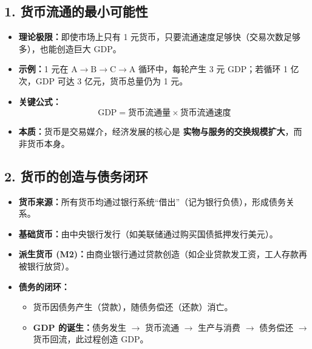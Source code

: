 \subsection*{1. 货币流通的最小可能性}
\begin{itemize}[leftmargin=*, nosep]
  \item \textbf{理论极限：}即使市场上只有 1 元货币，只要流通速度足够快（交易次数足够多），也能创造巨大 GDP。
  \item \textbf{示例：}1 元在 $\mathrm{A\to B\to C\to A}$ 循环中，每轮产生 3 元 GDP；若循环 1 亿次，GDP 可达 3 亿元，货币总量仍为 1 元。
  \item \textbf{关键公式：}
    \[
      \text{GDP} = \text{货币流通量} \times \text{货币流通速度}
    \]
  \item \textbf{本质：}货币是交易媒介，经济发展的核心是 \textbf{实物与服务的交换规模扩大}，而非货币本身。
\end{itemize}

\subsection*{2. 货币的创造与债务闭环}
\begin{itemize}[leftmargin=*, nosep]
  \item \textbf{货币来源：}所有货币均通过银行系统“借出”（记为银行负债），形成债务关系。
  \item \textbf{基础货币：}由中央银行发行（如美联储通过购买国债抵押发行美元）。
  \item \textbf{派生货币 (M2)：}由商业银行通过贷款创造（如企业贷款发工资，工人存款再被银行放贷）。
  \item \textbf{债务的闭环：}
    \begin{itemize}
      \item 货币因债务产生（贷款），随债务偿还（还款）消亡。
      \item \textbf{GDP 的诞生：}债务发生 $\to$ 货币流通 $\to$ 生产与消费 $\to$ 债务偿还 $\to$ 货币回流，此过程创造 GDP。
    \end{itemize}
\end{itemize}

